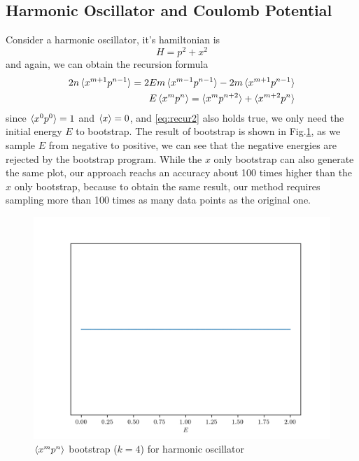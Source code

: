 \documentclass[aps, preprint,amsmath, amssymb]{revtex4-2}
\begin{document}
\subsection{Harmonic Oscillator and Coulomb Potential}

Consider a harmonic oscillator, it's hamiltonian is
\begin{equation}
    H = p^2 + x^2
\end{equation}
and again, we can obtain the recursion formula
\begin{align}
    2n\braket{x^{m + 1} p^{n - 1}} = 2Em\braket{x^{m - 1} p^{n - 1}} - 2m\braket{x^{m + 1} p^{n - 1}}\notag \\
    E\braket{x^m p^n} = \braket{x^m p^{n + 2}} + \braket{x^{m + 2} p^n}
\end{align}
since $\braket{x^0 p^0} = 1$ and $\braket{x} = 0$, and \eqref{eq:recur2} also holds true, we only need the initial energy $E$ to bootstrap. The result of bootstrap is shown in Fig.\ref{fig:harmonics}, as we sample $E$ from negative to positive, we can see that the negative energies are rejected by the bootstrap program. While the $x$ only bootstrap can also generate the same plot, our approach reachs an accuracy about 100 times higher than the $x$ only bootstrap, because to obtain the same result, our method requires sampling more than 100 times as many data points as the original one.
\begin{figure}
    \includegraphics[width=0.8\linewidth]{harmonics.png}
    \caption{$\braket{x^m p^n}$ bootstrap ($k = 4$) for harmonic oscillator}
    \label{fig:harmonics}
\end{figure}
\end{document}
